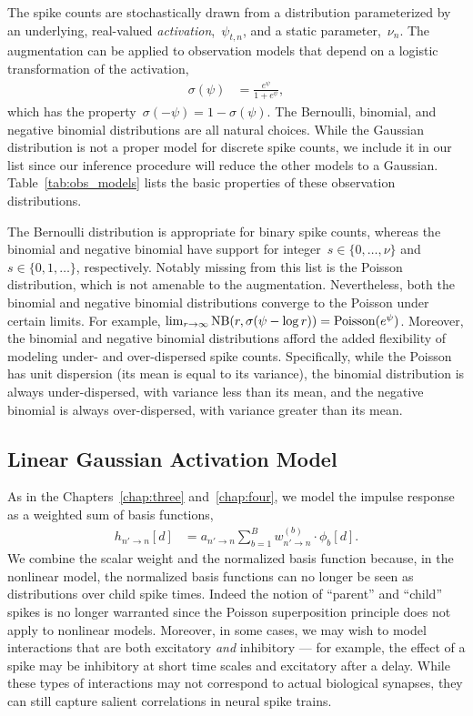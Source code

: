 The spike counts are stochastically drawn from a distribution
parameterized by an underlying, real-valued
\emph{activation},~$\psi_{t,n}$, and a static parameter,~$\nu_n$. 
The \polyagamma augmentation can be applied to observation models 
that depend on a logistic transformation of the activation,
\begin{align*}
  \sigma(\psi) &= \frac{e^\psi}{1+e^\psi},
\end{align*}
which has the property~$\sigma(-\psi) = 1-\sigma(\psi)$. The Bernoulli,
binomial, and negative binomial distributions are all natural choices.
While the Gaussian distribution is not a proper model for discrete
spike counts, we include it in our list since our inference procedure will 
reduce the other models to a Gaussian. Table~\ref{tab:obs_models} 
lists the basic properties of these observation distributions.

The Bernoulli distribution is appropriate for binary spike counts,
whereas the binomial and negative binomial have support for
integer~$s\in \{0, \ldots, \nu\}$ and~$s \in \{0, 1, \ldots \}$,
respectively.  Notably missing from this list is the Poisson
distribution, which is not amenable to the \polyagamma
augmentation. Nevertheless, both the binomial and negative binomial
distributions converge to the Poisson under certain limits. For
example, $\lim_{r \to \infty} \mathrm{NB}(r, \sigma(\psi - \log
r)) = \mathrm{Poisson}(e^\psi)$. Moreover, the binomial and negative
binomial distributions afford the added flexibility of modeling under-
and over-dispersed spike counts. Specifically, while the Poisson has
unit dispersion (its mean is equal to its variance), the binomial
distribution is always under-dispersed, with variance less than its
mean, and the negative binomial is always over-dispersed, with
variance greater than its mean.

\subsection{Linear Gaussian Activation Model}
As in the Chapters~\ref{chap:three} and~\ref{chap:four}, we model the
impulse response as a weighted sum of basis functions,
\begin{align}
\label{eq:glm_impulse}
h_{n' \to n}[d] &= a_{n' \to n} \sum_{b=1}^B w_{n' \to n}^{(b)} \cdot \phi_b[d].
\end{align}
We combine the scalar weight and the normalized basis function
because, in the nonlinear model, the normalized basis functions can no
longer be seen as distributions over child spike times. Indeed the
notion of ``parent'' and ``child'' spikes is no longer warranted since
the Poisson superposition principle does not apply to nonlinear
models.  Moreover, in some cases, we may wish to model interactions
that are both excitatory \emph{and} inhibitory --- for example, the
effect of a spike may be inhibitory at short time scales and
excitatory after a delay. While these types of interactions may not
correspond to actual biological synapses, they can still capture
salient correlations in neural spike trains.


